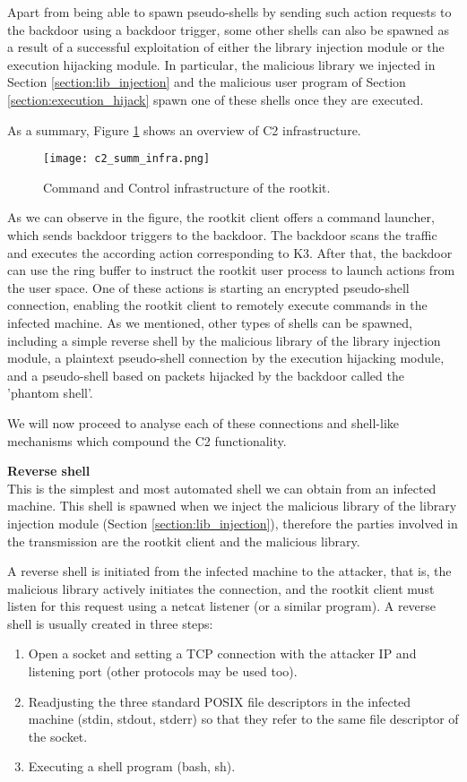 Apart from being able to spawn pseudo-shells by sending such action requests to the backdoor using a backdoor trigger, some other shells can also be spawned as a result of a successful exploitation of either the library injection module or the execution hijacking module. In particular, the malicious library we injected in Section \ref{section:lib_injection} and the malicious user program of Section \ref{section:execution_hijack} spawn one of these shells once they are executed.

As a summary, Figure \ref{fig:c2_summ_infra} shows an overview of C2 infrastructure.

\begin{figure}[htbp]
	\centering
	\texttt{[image: c2\_summ\_infra.png]}
	\caption{Command and Control infrastructure of the rootkit.}
	\label{fig:c2_summ_infra}
\end{figure}

As we can observe in the figure, the rootkit client offers a command launcher, which sends backdoor triggers to the backdoor. The backdoor scans the traffic and executes the according action corresponding to K3. After that, the backdoor can use the ring buffer to instruct the rootkit user process to launch actions from the user space. One of these actions is starting an encrypted pseudo-shell connection, enabling the rootkit client to remotely execute commands in the infected machine. As we mentioned, other types of shells can be spawned, including a simple reverse shell by the malicious library of the library injection module, a plaintext pseudo-shell connection by the execution hijacking module, and a pseudo-shell based on packets hijacked by the backdoor called the 'phantom shell'. 

We will now proceed to analyse each of these connections and shell-like mechanisms which compound the C2 functionality.


\textbf{Reverse shell}\\
This is the simplest and most automated shell we can obtain from an infected machine. This shell is spawned when we inject the malicious library of the library injection module (Section \ref{section:lib_injection}), therefore the parties involved in the transmission are the rootkit client and the malicious library.

A reverse shell is initiated from the infected machine to the attacker, that is, the malicious library actively initiates the connection, and the rootkit client must listen for this request using a netcat listener (or a similar program). A reverse shell is usually created in three steps:
\begin{enumerate}
\item Open a socket and setting a TCP connection with the attacker IP and listening port (other protocols may be used too).
\item Readjusting the three standard POSIX file descriptors in the infected machine (stdin, stdout, stderr) \cite{file_descriptors} so that they refer to the same file descriptor of the socket.
\item Executing a shell program (bash, sh).
\end{enumerate}

